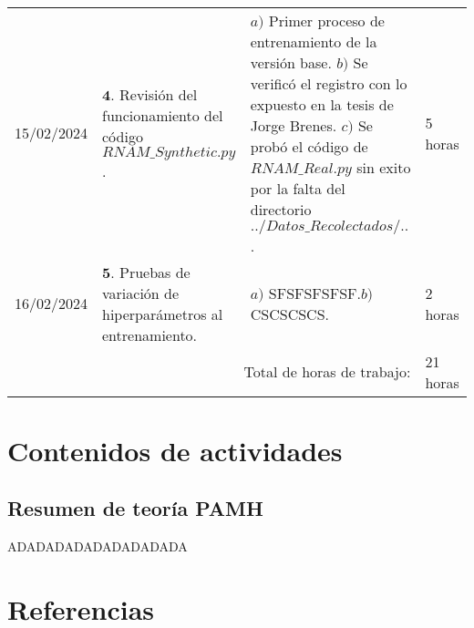 \documentclass[12pt]{article}
\begin{document}
\hfill\\
\begin{minipage}[h]{\textwidth}
	\centering
	\begin{tabularx}{\textwidth}{|p{2cm}|X|X|p{2cm}|} 
		\hline		
		
	 	15/02/2024 & 
	 	$\mathbf{4}.$ Revisión del funcionamiento del código $RNAM\_ Synthetic.py$. & 
	 	$a)$ Primer proceso de entrenamiento de la versión base. \newline 
	 	$b)$ Se verificó el registro con lo expuesto en la tesis de Jorge Brenes. \newline 
	 	$c)$ Se probó el código de $RNAM\_ Real.py$ sin exito por la falta del directorio $../Datos\_ Recolectados/..$. & 
	 	5 horas \\
	 	16/02/2024 & 
	 	$\mathbf{5}.$ Pruebas de variación de hiperparámetros al entrenamiento. & 
	 	$a)$ SFSFSFSFSF.\newline $b)$ CSCSCSCS. \newline & 
	 	2 horas \\
	 	\hline
		\multicolumn{3}{|r|}{Total de horas de trabajo:} & 21 horas \\ 
	 	\hline                 
	\end{tabularx}
\end{minipage}


\section*{Contenidos de actividades}

\subsection*{Resumen de teoría PAMH}

ADADADADADADADADADA
\cite{DataScience}




\newpage

\section*{Referencias}
\renewcommand\refname{}


\end{document}
